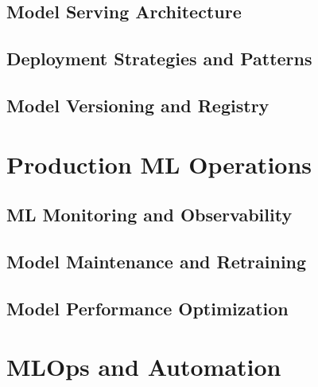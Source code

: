 \documentclass[12pt,a4paper]{book}
\theoremstyle{definition}
\theoremstyle{plain}
\theoremstyle{remark}
\begin{document}
\chapter{Model Serving Architecture}
\label{ch:model_serving}


\chapter{Deployment Strategies and Patterns}
\label{ch:deployment_strategies}


\chapter{Model Versioning and Registry}
\label{ch:model_versioning}


\part{Production ML Operations}

\chapter{ML Monitoring and Observability}
\label{ch:monitoring}


\chapter{Model Maintenance and Retraining}
\label{ch:model_maintenance}


\chapter{Model Performance Optimization}
\label{ch:performance_optimization}


\part{MLOps and Automation}
\end{document}
